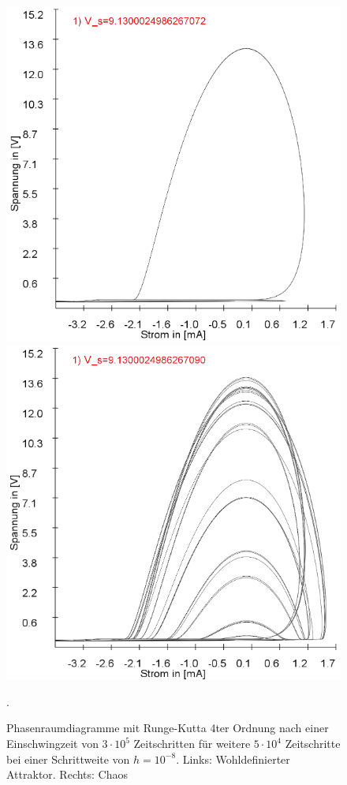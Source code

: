 \documentclass[11,5pt, twoside]{article}
\begin{document}
\begin{figure}[!htbp]
\centering
\includegraphics[scale=0.33]{schwing-runge-nach300k-weitere50k-10-8-searching-chaos1}
\includegraphics[scale=0.33]{schwing-runge-nach300k-weitere50k-10-8-finding-chaos1}
\caption{Phasenraumdiagramme mit Runge-Kutta 4ter Ordnung nach einer Einschwingzeit von  $3\cdot10^5$ Zeitschritten für weitere $5\cdot10^4$ Zeitschritte bei einer Schrittweite von $h=10^{-8}$. Links: Wohldefinierter Attraktor. Rechts: Chaos}. 
\label{fig:ldr-0004}
\end{figure}
\end{document}
